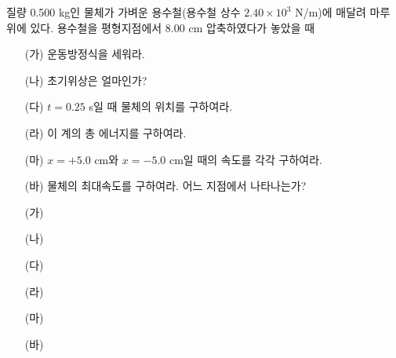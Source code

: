 \documentclass[floatfix,nofootinbib,superscriptaddress,fleqn]{revtex4-2}
\begin{document}


\vspace{1.cm}
질량 0.500 kg인 물체가 가벼운 용수철(용수철 상수 $2.40\times 10^3$
N/m)에 매달려 마루 위에 있다. 
용수철을 평형지점에서 8.00 cm 압축하였다가 놓았을 때
\begin{itemize}
\item[(가)] 운동방정식을 세워라.
\item[(나)] 초기위상은 얼마인가?
\item[(다)] $t=0.25$ s일 때 물체의 위치를 구하여라.
\item[(라)] 이 계의 총 에너지를 구하여라.
\item[(마)] $x=+5.0$ cm와 $x=-5.0$ cm일 때의 속도를 각각 구하여라.
\item[(바)] 물체의 최대속도를 구하여라. 어느 지점에서 나타나는가?
 \end{itemize}

 \begin{itemize}
  \item[(가)] 
  \item[(나)] 
  \item[(다)] 
  \item[(라)] 
  \item[(마)] 
  \item[(바)] 
 \end{itemize}
\end{document}
